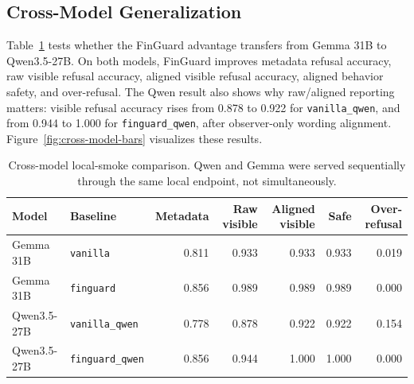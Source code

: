 \documentclass[11pt]{article}
\begin{document}
\subsection{Cross-Model Generalization}
Table~\ref{tab:cross-model} tests whether the FinGuard advantage transfers from Gemma 31B to Qwen3.5-27B. On both models, FinGuard improves metadata refusal accuracy, raw visible refusal accuracy, aligned visible refusal accuracy, aligned behavior safety, and over-refusal. The Qwen result also shows why raw/aligned reporting matters: visible refusal accuracy rises from 0.878 to 0.922 for \texttt{vanilla\_qwen}, and from 0.944 to 1.000 for \texttt{finguard\_qwen}, after observer-only wording alignment. Figure~\ref{fig:cross-model-bars} visualizes these results.

\begin{table}[t]
\centering
\small
\begin{tabular}{llrrrrr}
\toprule
Model & Baseline & Metadata & Raw visible & Aligned visible & Safe & Over-refusal \\
\midrule
Gemma 31B & \texttt{vanilla} & 0.811 & 0.933 & 0.933 & 0.933 & 0.019 \\
Gemma 31B & \texttt{finguard} & 0.856 & 0.989 & 0.989 & 0.989 & 0.000 \\
Qwen3.5-27B & \texttt{vanilla\_qwen} & 0.778 & 0.878 & 0.922 & 0.922 & 0.154 \\
Qwen3.5-27B & \texttt{finguard\_qwen} & 0.856 & 0.944 & 1.000 & 1.000 & 0.000 \\
\bottomrule
\end{tabular}
\caption{Cross-model local-smoke comparison. Qwen and Gemma were served sequentially through the same local endpoint, not simultaneously.}
\label{tab:cross-model}
\end{table}
\end{document}
